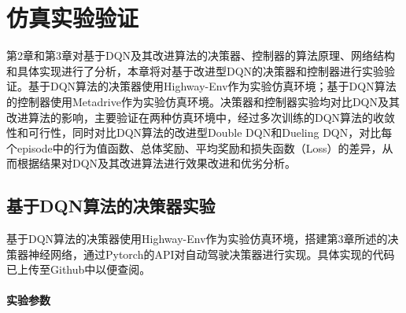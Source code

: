 %
%
%
%
%

\chapter{仿真实验验证}

第2章和第3章对基于DQN及其改进算法的决策器、控制器的算法原理、网络结构和具体实现进行了分析，本章将对基于改进型DQN的决策器和控制器进行实验验证。基于DQN算法的决策器使用Highway-Env作为实验仿真环境；基于DQN算法的控制器使用Metadrive作为实验仿真环境。决策器和控制器实验均对比DQN及其改进算法的影响，主要验证在两种仿真环境中，经过多次训练的DQN算法的收敛性和可行性，同时对比DQN算法的改进型Double DQN和Dueling DQN，对比每个episode中的行为值函数、总体奖励、平均奖励和损失函数（Loss）的差异，从而根据结果对DQN及其改进算法进行效果改进和优劣分析。

\section{基于DQN算法的决策器实验}\label{4.1基于DQN算法的决策器实验}

基于DQN算法的决策器使用Highway-Env作为实验仿真环境，搭建第3章所述的决策器神经网络，通过Pytorch的API对自动驾驶决策器进行实现。具体实现的代码已上传至Github中以便查阅\cite{highway-env-dqn}。

\subsubsection{实验参数}

\begin{table}[htbp]
    \caption{决策器网络参数}\label{决策器网络参数}
    \centering
    \renewcommand\arraystretch{1.5}
\end{table}

